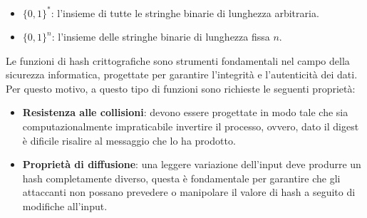 \begin{itemize}
    \item $\{0,1\}^*$: l'insieme di tutte le stringhe binarie di lunghezza arbitraria.
    \item $\{0,1\}^n$: l'insieme delle stringhe binarie di lunghezza fissa $n$.
\end{itemize}

\vspace{0.2cm}
\noindent
Le funzioni di hash crittografiche sono strumenti fondamentali nel campo della
sicurezza informatica, progettate per garantire l'integrità e l'autenticità dei
dati. Per questo motivo, a questo tipo di funzioni sono richieste le seguenti proprietà: 
\begin{itemize}
    \item \textbf{Resistenza alle collisioni}: devono essere progettate in modo tale che sia computazionalmente impraticabile invertire il processo, ovvero,  dato il digest è dificile risalire 
    al messaggio che lo ha prodotto.
    \item \textbf{Proprietà di diffusione}: una leggere variazione dell'input deve produrre un hash completamente diverso, questa è fondamentale per garantire che gli attaccanti non possano prevedere o
    manipolare il valore di hash a seguito di modifiche all'input.
\end{itemize}    

